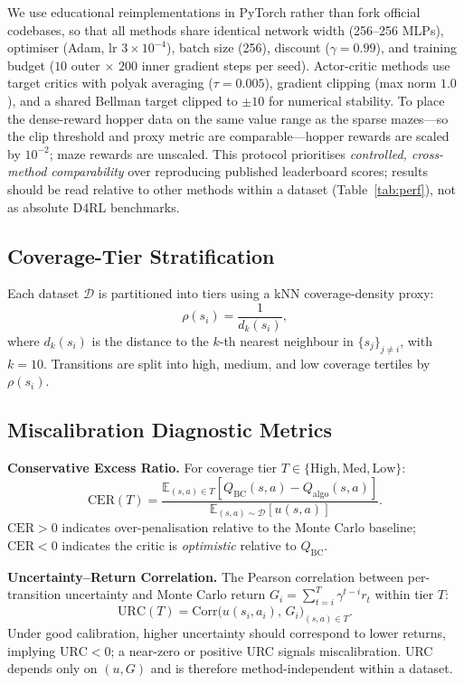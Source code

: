 \documentclass[conference]{IEEEtran}
\begin{document}
We use educational reimplementations in PyTorch rather than fork official
codebases, so that all methods share identical network width
(256--256 MLPs), optimiser (Adam, lr $3{\times}10^{-4}$), batch size
(256), discount ($\gamma{=}0.99$), and training budget ($10$ outer
$\times$ $200$ inner gradient steps per seed). Actor-critic methods use
target critics with polyak averaging ($\tau{=}0.005$), gradient clipping
(max norm $1.0$), and a shared Bellman target clipped to $\pm 10$ for
numerical stability. To place the dense-reward hopper data on the same
value range as the sparse mazes---so the clip threshold and proxy metric are
comparable---hopper rewards are scaled by $10^{-2}$; maze rewards are
unscaled. This protocol prioritises \emph{controlled, cross-method
comparability} over reproducing published leaderboard scores; results should
be read relative to other methods within a dataset (Table~\ref{tab:perf}),
not as absolute D4RL benchmarks.

\subsection{Coverage-Tier Stratification}

Each dataset $\mathcal{D}$ is partitioned into tiers using a kNN
coverage-density proxy:
\begin{equation}
  \rho(s_i) = \frac{1}{d_k(s_i)},
  \label{eq:coverage}
\end{equation}
where $d_k(s_i)$ is the distance to the $k$-th nearest neighbour in
$\{s_j\}_{j\neq i}$, with $k{=}10$. Transitions are split into high, medium,
and low coverage tertiles by $\rho(s_i)$.

\subsection{Miscalibration Diagnostic Metrics}

\textbf{Conservative Excess Ratio.} For coverage tier
$T \in \{\mathrm{High}, \mathrm{Med}, \mathrm{Low}\}$:
\begin{equation}
  \mathrm{CER}(T)=
  \frac{\mathbb{E}_{(s,a)\in T}[Q_{\mathrm{BC}}(s,a)-Q_{\mathrm{algo}}(s,a)]}
       {\mathbb{E}_{(s,a)\sim\mathcal{D}}[u(s,a)]}.
  \label{eq:cer}
\end{equation}
$\mathrm{CER}{>}0$ indicates over-penalisation relative to the Monte Carlo
baseline; $\mathrm{CER}{<}0$ indicates the critic is \emph{optimistic}
relative to $Q_{\mathrm{BC}}$.

\textbf{Uncertainty--Return Correlation.} The Pearson correlation
between per-transition uncertainty and Monte Carlo return
$G_i = \sum_{t=i}^{T}\gamma^{t-i} r_t$ within tier $T$:
\begin{equation}
  \mathrm{URC}(T)=
  \mathrm{Corr}\!\bigl(u(s_i,a_i),\,G_i\bigr)_{\!(s,a)\in T}.
  \label{eq:urc}
\end{equation}
Under good calibration, higher uncertainty should correspond to lower
returns, implying $\mathrm{URC}{<}0$; a near-zero or positive URC signals
miscalibration. URC depends only on $(u,G)$ and is therefore
method-independent within a dataset.
\end{document}
